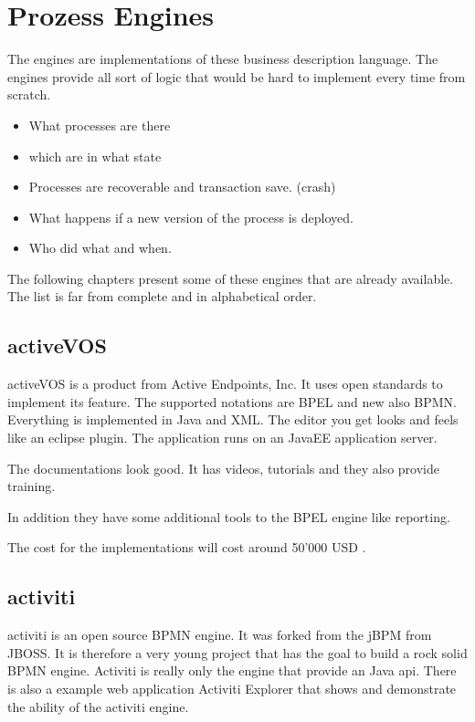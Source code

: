 \documentclass[paper=a4,twoside=false,BCOR=0mm,DIV=calc,fontsize=12pt]{scrartcl}
\begin{document}
\section{Prozess Engines}
The engines are implementations of these business description language. The engines provide all sort of logic that would be hard to implement every time from scratch.
\begin{itemize}
  \item What processes are there
  \item which are in what state
  \item Processes are recoverable and transaction save. (crash)
  \item What happens if a new version of the process is deployed.
  \item Who did what and when.
\end{itemize}


The following chapters present some of these engines that are already available. The list is far from complete and in alphabetical order.

\subsection{activeVOS}
activeVOS \cite{activevos} is a product from Active Endpoints, Inc. It uses open standards to implement its feature. The supported notations are BPEL and new also BPMN. Everything is implemented in Java and XML. The editor you get looks and feels like an eclipse plugin. The application runs on an JavaEE application server.

The documentations look good. It has videos, tutorials and they also provide training. 

In addition they have some additional tools to the BPEL engine like reporting.

The cost for the implementations will cost around 50'000 USD \cite{activvosscost}.


\subsection{activiti}
activiti \cite{activiti} is an open source BPMN engine. It was forked from the jBPM \cite{jbpm} from JBOSS. It is therefore a very young project that has the goal to build a rock solid BPMN engine. Activiti is really only the engine that provide an Java api. There is also a example web application Activiti Explorer that shows and demonstrate the ability of the activiti engine.
\end{document}
